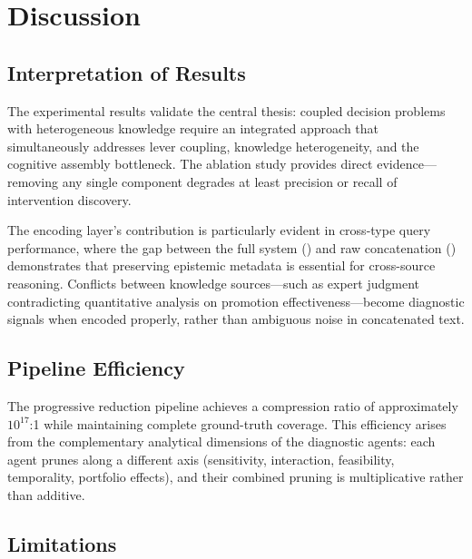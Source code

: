 \section{Discussion}
\label{sec:discussion}

\subsection{Interpretation of Results}

The experimental results validate the central thesis: coupled decision problems with heterogeneous knowledge require an integrated approach that simultaneously addresses lever coupling, knowledge heterogeneity, and the cognitive assembly bottleneck.
The ablation study provides direct evidence---removing any single component degrades at least precision or recall of intervention discovery.

The encoding layer's contribution is particularly evident in cross-type query performance, where the gap between the full system (\CROSSTYPEACCURACY{}) and raw concatenation (\RAWCONCATACCURACY{}) demonstrates that preserving epistemic metadata is essential for cross-source reasoning.
Conflicts between knowledge sources---such as expert judgment contradicting quantitative analysis on promotion effectiveness---become diagnostic signals when encoded properly, rather than ambiguous noise in concatenated text.

\subsection{Pipeline Efficiency}

The progressive reduction pipeline achieves a compression ratio of approximately $10^{17}$:1 while maintaining complete ground-truth coverage.
This efficiency arises from the complementary analytical dimensions of the diagnostic agents: each agent prunes along a different axis (sensitivity, interaction, feasibility, temporality, portfolio effects), and their combined pruning is multiplicative rather than additive.

\subsection{Limitations}

